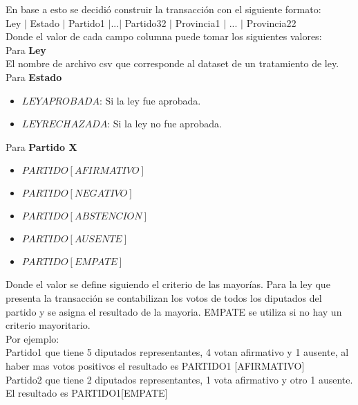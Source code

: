 \documentclass{endm}
\begin{document}
En base a esto se decidió construir la transacción con el siguiente formato: \\

Ley $|$ Estado $|$ Partido1 $|$...$|$ Partido32 $|$ Provincia1 $|$ ... $|$ Provincia22 \\

Donde el valor de cada campo columna puede tomar los siguientes valores: \\

Para \textbf{Ley} \\

El nombre de archivo csv que corresponde al dataset de un tratamiento de ley. \\

Para \textbf{Estado} \\

\begin{itemize}
\item $LEY APROBADA$: Si la ley fue aprobada.
\item $LEY RECHAZADA$: Si la ley no fue aprobada. \\
\end{itemize}

 Para \textbf{Partido X} \\

\begin{itemize}
\item $PARTIDO [AFIRMATIVO]$
\item $PARTIDO [NEGATIVO]$
\item $PARTIDO [ABSTENCION]$
\item $PARTIDO [AUSENTE]$ 
\item $PARTIDO [EMPATE]$ \\
\end{itemize}

Donde el valor se define siguiendo el criterio de las mayorías. Para la ley que presenta la transacción se contabilizan los votos de todos los diputados del partido
y se asigna el resultado de la mayoria. EMPATE se utiliza si no hay un criterio mayoritario. \\

Por ejemplo: \\

Partido1 que tiene 5 diputados representantes, 4 votan afirmativo y 1 ausente, al haber mas votos positivos el resultado es PARTIDO1 [AFIRMATIVO] \\

Partido2 que tiene 2 diputados representantes, 1 vota afirmativo y otro 1 ausente. El resultado es PARTIDO1[EMPATE] \\
\end{document}
